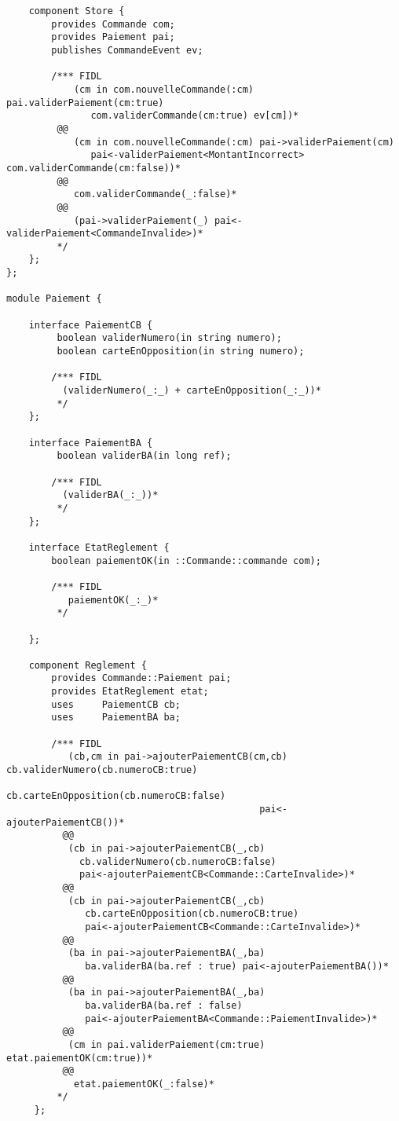 \begin{lstlisting}
    component Store {
        provides Commande com;
        provides Paiement pai;
        publishes CommandeEvent ev;
     
        /*** FIDL
            (cm in com.nouvelleCommande(:cm) pai.validerPaiement(cm:true) 
               com.validerCommande(cm:true) ev[cm])*
         @@ 
            (cm in com.nouvelleCommande(:cm) pai->validerPaiement(cm) 
               pai<-validerPaiement<MontantIncorrect> com.validerCommande(cm:false))*
         @@ 
            com.validerCommande(_:false)*
         @@
            (pai->validerPaiement(_) pai<-validerPaiement<CommandeInvalide>)*
         */
    };         
};

module Paiement {
     
    interface PaiementCB {
         boolean validerNumero(in string numero);
         boolean carteEnOpposition(in string numero);

        /*** FIDL 
          (validerNumero(_:_) + carteEnOpposition(_:_))*
         */
    };
    
    interface PaiementBA {
         boolean validerBA(in long ref);

        /*** FIDL
          (validerBA(_:_))*
         */
    };

    interface EtatReglement {
        boolean paiementOK(in ::Commande::commande com);

        /*** FIDL
           paiementOK(_:_)*
         */
         
    };

    component Reglement {
        provides Commande::Paiement pai;
        provides EtatReglement etat;
        uses     PaiementCB cb;
        uses     PaiementBA ba;

        /*** FIDL 
           (cb,cm in pai->ajouterPaiementCB(cm,cb) cb.validerNumero(cb.numeroCB:true) 
                                             cb.carteEnOpposition(cb.numeroCB:false)
                                             pai<-ajouterPaiementCB())*
          @@
           (cb in pai->ajouterPaiementCB(_,cb)
             cb.validerNumero(cb.numeroCB:false) 
             pai<-ajouterPaiementCB<Commande::CarteInvalide>)*
          @@
           (cb in pai->ajouterPaiementCB(_,cb) 
              cb.carteEnOpposition(cb.numeroCB:true) 
              pai<-ajouterPaiementCB<Commande::CarteInvalide>)*
          @@ 
           (ba in pai->ajouterPaiementBA(_,ba) 
              ba.validerBA(ba.ref : true) pai<-ajouterPaiementBA())*
          @@ 
           (ba in pai->ajouterPaiementBA(_,ba) 
              ba.validerBA(ba.ref : false) 
              pai<-ajouterPaiementBA<Commande::PaiementInvalide>)*
          @@
           (cm in pai.validerPaiement(cm:true) etat.paiementOK(cm:true))*
          @@
            etat.paiementOK(_:false)*
         */
     };    


\end{lstlisting}
